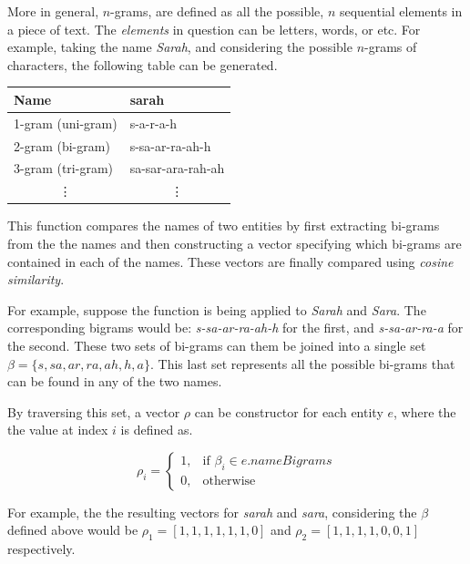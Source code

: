 \documentclass[epsfig,a4paper,11pt,titlepage,twoside,openany]{book}
\begin{document}
More in general, $n$-grams, are defined as all the possible, $n$ sequential elements in a piece of text. The \textit{elements} in question can be letters, words, or etc. For example, taking the name \textit{Sarah}, and considering the possible $n$-grams of characters, the following table can be generated.

\begin{table}[H]
\centering
\begin{tabular}{l|l}
Name                       & sarah                     \\ \hline
1-gram (uni-gram)          & s-a-r-a-h                 \\ \hline
2-gram (bi-gram)           & s-sa-ar-ra-ah-h           \\ \hline
3-gram (tri-gram)          & sa-sar-ara-rah-ah         \\ \hline
\multicolumn{1}{c|}{\vdots} & \multicolumn{1}{c}{\vdots}
\end{tabular}
\label{tab:ngram-generation-example}
\end{table}

This function compares the names of two entities by first extracting bi-grams from the the names and then constructing a vector specifying which bi-grams are contained in each of the names. These vectors are finally compared using \textit{cosine similarity}. 

For example, suppose the function is being applied to \textit{Sarah} and \textit{Sara}. The corresponding bigrams would be: \textit{s-sa-ar-ra-ah-h} for the first, and \textit{s-sa-ar-ra-a} for the second. These two sets of bi-grams can them be joined into a single set $\beta = \{s, sa, ar, ra, ah, h, a\}$. This last set represents all the possible bi-grams that can be found in any of the two names. 

By traversing this set, a vector $\rho$ can be constructor for each entity $e$, where the the value at index $i$ is defined as. 

\begin{equation*}
\rho_i = \begin{cases}
            1, & \text{if } \beta_i \in e.nameBigrams \\
            0, & \text{otherwise}
        \end{cases} 
\end{equation*}

For example, the the resulting vectors for \textit{sarah} and \textit{sara}, considering the $\beta$ defined above would be $\rho_1 = [1, 1, 1, 1, 1, 1, 0]$ and $\rho_2 = [1, 1, 1, 1, 0, 0, 1]$ respectively.
\end{document}

